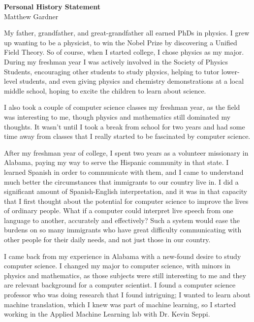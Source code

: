 \documentclass[onecolumn, 12pt]{article}
\begin{document}
\pagestyle{empty}

\begin{center}
  \textbf{Personal History Statement}\\
  Matthew Gardner
\end{center}

My father, grandfather, and great-grandfather all earned PhDs in physics.  I
grew up wanting to be a physicist, to win the Nobel Prize by discovering a
Unified Field Theory.  So of course, when I started college, I chose physics as
my major.  During my freshman year I was actively involved in the Society of
Physics Students, encouraging other students to study physics, helping to tutor
lower-level students, and even giving physics and chemistry demonstrations at a
local middle school, hoping to excite the children to learn about science.

I also took a couple of computer science classes my freshman year, as the field
was interesting to me, though physics and mathematics still dominated my
thoughts.  It wasn't until I took a break from school for two years and had
some time away from classes that I really started to be fascinated by computer
science.

After my freshman year of college, I spent two years as a volunteer missionary
in Alabama, paying my way to serve the Hispanic community in that state.  I
learned Spanish in order to communicate with them, and I came to understand
much better the circumstances that immigrants to our country live in.  I did a
significant amount of Spanish-English interpretation, and it was in that
capacity that I first thought about the potential for computer science to
improve the lives of ordinary people.  What if a computer could interpret live
speech from one language to another, accurately and effectively?  Such a system
would ease the burdens on so many immigrants who have great difficulty
communicating with other people for their daily needs, and not just those in
our country.

I came back from my experience in Alabama with a new-found desire to study
computer science.  I changed my major to computer science, with minors in
physics and mathematics, as those subjects were still interesting to me and
they are relevant background for a computer scientist.  I found a computer
science professor who was doing research that I found intriguing; I wanted to
learn about machine translation, which I knew was part of machine learning, so
I started working in the Applied Machine Learning lab with Dr. Kevin Seppi.
\end{document}
